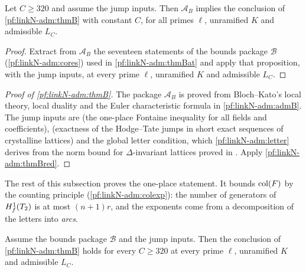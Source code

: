 \begin{proposition}\label{pf:linkN-adm:thmBred}
Let $C\ge320$ and assume the jump inputs. Then $\mathcal A_B$ implies the conclusion of \cref{pf:linkN-adm:thmB} with
constant $C$, for all primes $\ell$, unramified $K$ and admissible $L_C$.
\end{proposition}

\begin{proof}
Extract from $\mathcal A_B$ the seventeen statements of the bounds package $\mathcal B$ (\cref{pf:linkN-adm:cores}) used in
\cref{pf:linkN-adm:thmBat} and apply that proposition,
with the jump inputs, at every prime $\ell$, unramified $K$ and admissible $L_C$.
\end{proof}

\begin{proof}[Proof of \cref{pf:linkN-adm:thmB}]
The package $\mathcal A_B$ is proved from Bloch--Kato's local theory, local duality and the Euler characteristic formula in
\cref{pf:linkN-adm:admB}. The jump inputs are
 (the one-place Fontaine inequality for all
fields and coefficients),  (exactness of the Hodge--Tate jumps in short exact
sequences of crystalline lattices) and the global letter condition, which \cref{pf:linkN-adm:letter} derives from the norm
bound for $\Delta$-invariant lattices proved in . Apply
\cref{pf:linkN-adm:thmBred}.
\end{proof}

The rest of this subsection proves the one-place statement. It bounds $\operatorname{col}(F)$ by the counting principle
(\cref{pf:linkN-adm:colexp}): the number of generators of $H^1_{f}(T_2)$ is at most $(n+1)r$, and the exponents come from
a decomposition of the letters into \emph{arcs}.

\begin{proposition}\label{pf:linkN-adm:thmBat}
Assume the bounds package $\mathcal B$ and the jump inputs. Then the conclusion of
\cref{pf:linkN-adm:thmB} holds for every $C\ge320$ at every prime $\ell$, unramified $K$ and admissible $L_C$.
\end{proposition}

